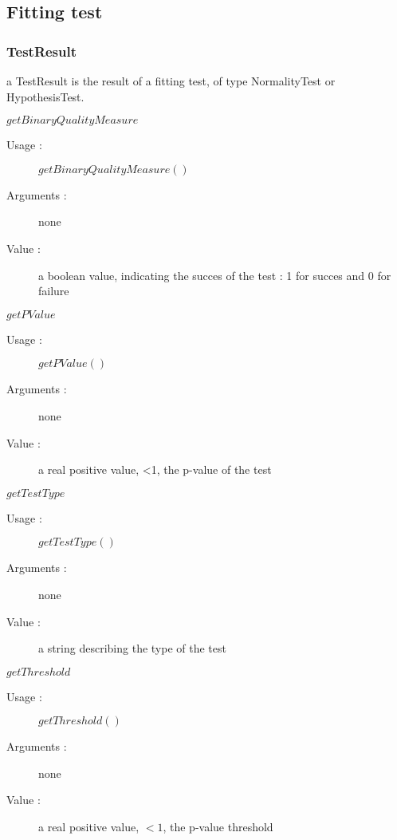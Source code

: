 \newpage \subsection{Fitting test}
\subsubsection{TestResult}

\begin{description}
\item[Usage :] a TestResult is the result of a fitting test, of type NormalityTest or HypothesisTest.

\item[Some methods :]  \rule{0pt}{1em}

  \begin{description}
  \item $getBinaryQualityMeasure$
    \begin{description}
    \item[Usage :] $getBinaryQualityMeasure()$
    \item[Arguments :] none
    \item[Value :]  a boolean value, indicating the succes of the test : 1 for succes and 0 for failure
    \end{description}
    \bigskip

  \item $getPValue$
    \begin{description}
    \item[Usage :] $getPValue()$
    \item[Arguments :] none
    \item[Value :] a real positive value, <1, the p-value of the test
    \end{description}
    \bigskip

  \item $getTestType$
    \begin{description}
    \item[Usage :] $getTestType()$
    \item[Arguments :] none
    \item[Value :] a string describing the type of the test
    \end{description}
    \bigskip


  \item $getThreshold$
    \begin{description}
    \item[Usage :] $getThreshold()$
    \item[Arguments :] none
    \item[Value :] a real positive value, $<1$, the p-value threshold
    \end{description}

  \end{description}

\end{description}





